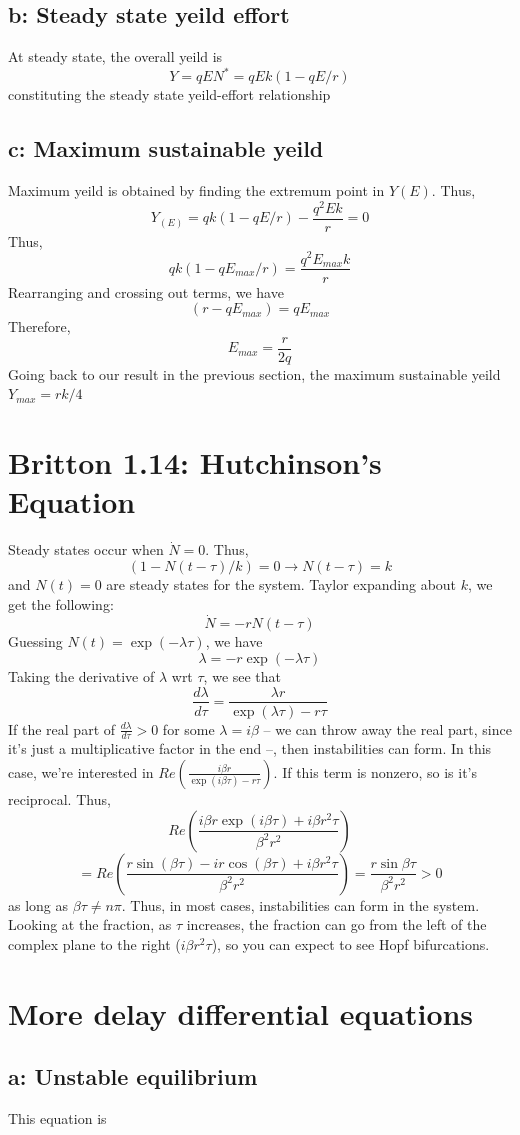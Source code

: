 \documentclass[english]{article}
\begin{document}
\subsection*{b: Steady state yeild effort}
At steady state, the overall yeild is 
$$ Y = qEN^{*} = qEk(1-qE/r) $$
constituting the steady state yeild-effort relationship
\subsection*{c: Maximum sustainable yeild}
Maximum yeild is obtained by finding the extremum point in $Y(E)$. Thus,
$$ Y_{(E)} = qk(1-qE/r) -\frac{q^{2}Ek}{r} = 0$$
Thus,
$$ qk(1-qE_{max}/r) = \frac{q^{2}E_{max}k}{r} $$
Rearranging and crossing out terms, we have
$$ (r-qE_{max}) = qE_{max}$$
Therefore,
$$ E_{max} = \frac{r}{2q} $$
Going back to our result in the previous section, the maximum sustainable yeild
$Y_{max} = rk/4$

\section{Britton 1.14: Hutchinson's Equation}
Steady states occur when $\dot{N}=0$. Thus,
$$ (1-N(t-\tau)/k) =0 \rightarrow N(t-\tau) = k $$
and $N(t) = 0$ are steady states for the system. Taylor expanding about $k$,
we get the following:
$$ \dot{N} = -rN(t-\tau) $$
Guessing $N(t) = \exp(-\lambda \tau)$, we have
$$ \lambda = -r\exp{(-\lambda \tau)}$$
Taking the derivative of $\lambda$ wrt $\tau$, we see that
$$ \frac{d\lambda}{d\tau} = \frac{\lambda r}{\exp{(\lambda \tau)}-r\tau}$$
If the real part of $\frac{d\lambda}{d\tau}>0$ for some $\lambda = i\beta$ 
-- we can throw away the real part, since it's just a multiplicative factor
in the end --, then instabilities can form. In this case, we're interested in
$ Re(\frac{i\beta r}{\exp(i\beta\tau)-r\tau}) $. If this term is nonzero, so is it's
reciprocal. Thus,
$$ Re\left(\frac{i\beta r\exp(i\beta\tau)+i\beta r^{2}\tau}{\beta^{2}r^{2}}\right)$$
$$ = Re\left(\frac{r\sin(\beta\tau)-ir\cos(\beta\tau)+i\beta r^{2}\tau}{\beta^{2}r^{2}}\right) 
= \frac{r\sin{\beta\tau}}{\beta^{2}r^{2}} > 0$$
as long as $\beta\tau \neq n\pi$. Thus, in most cases, instabilities can form 
in the system. Looking at the fraction, as $\tau$ increases, the fraction can go
from the left of the complex plane to the right ($i\beta r^{2}\tau$), so you can
expect to see Hopf bifurcations.

\section{More delay differential equations}
\subsection*{a: Unstable equilibrium}
This equation is 
\end{document}
